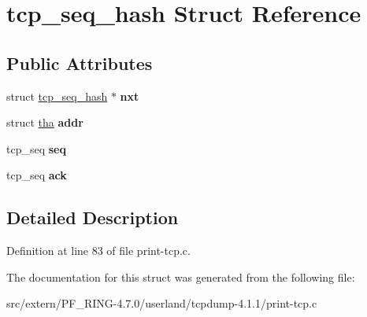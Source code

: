 \hypertarget{structtcp__seq__hash}{
\section{tcp\_\-seq\_\-hash Struct Reference}
\label{structtcp__seq__hash}
}
\subsection*{Public Attributes}
\begin{DoxyCompactItemize}
\item 
\hypertarget{structtcp__seq__hash_a968397ce7ede7b32999e6ae33f3167ec}{
struct \hyperlink{structtcp__seq__hash}{tcp\_\-seq\_\-hash} $\ast$ {\bfseries nxt}}
\label{structtcp__seq__hash_a968397ce7ede7b32999e6ae33f3167ec}

\item 
\hypertarget{structtcp__seq__hash_a878286c5bd26c1c8fcb5553b9fc6cf3c}{
struct \hyperlink{structtha}{tha} {\bfseries addr}}
\label{structtcp__seq__hash_a878286c5bd26c1c8fcb5553b9fc6cf3c}

\item 
\hypertarget{structtcp__seq__hash_a5bc167d51841b2677319f6e6b6901dc2}{
tcp\_\-seq {\bfseries seq}}
\label{structtcp__seq__hash_a5bc167d51841b2677319f6e6b6901dc2}

\item 
\hypertarget{structtcp__seq__hash_a3a849bfa5ede2339e2a53d7fdc6d3907}{
tcp\_\-seq {\bfseries ack}}
\label{structtcp__seq__hash_a3a849bfa5ede2339e2a53d7fdc6d3907}

\end{DoxyCompactItemize}


\subsection{Detailed Description}


Definition at line 83 of file print-\/tcp.c.



The documentation for this struct was generated from the following file:\begin{DoxyCompactItemize}
\item 
src/extern/PF\_\-RING-\/4.7.0/userland/tcpdump-\/4.1.1/print-\/tcp.c\end{DoxyCompactItemize}
